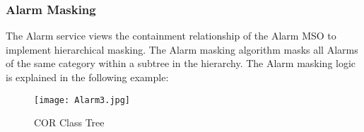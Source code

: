 \begin{flushleft}
\subsubsection{Alarm Masking}

The Alarm service views the containment relationship of the Alarm MSO to implement hierarchical masking. The Alarm masking algorithm masks all Alarms of
the same category within a subtree in the hierarchy. The Alarm masking logic is explained in the following example:
\newpage

\end{flushleft}

\begin{figure}
\begin{center}
\texttt{[image: Alarm3.jpg]}
\end{center}
\caption{COR Class Tree}
\end{figure}

